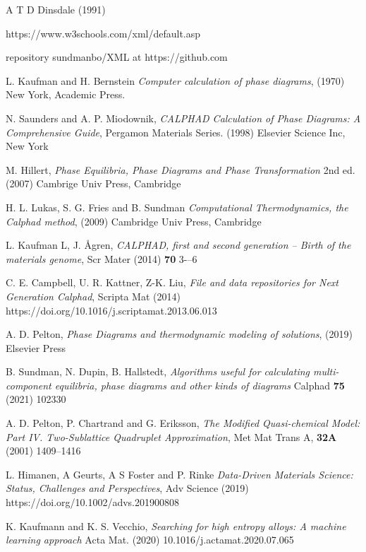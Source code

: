 \documentclass[12pt]{article}
\begin{document}
\begin{thebibliography}{91zzz}

 A T D Dinsdale (1991)

 https://www.w3schools.com/xml/default.asp

 repository sundmanbo/XML at https://github.com

 L. Kaufman and H. Bernstein {\em Computer calculation
  of phase diagrams}, (1970) New York, Academic Press.

 N. Saunders and A. P. Miodownik, {\em CALPHAD
  Calculation of Phase Diagrams: A Comprehensive Guide}, Pergamon
  Materials Series. (1998) Elsevier Science Inc, New York

 M. Hillert, {\em Phase Equilibria, Phase Diagrams and
  Phase Transformation} 2nd ed. (2007) Cambrige Univ Press, Cambridge
  
 H. L. Lukas, S. G. Fries and B. Sundman {\em
  Computational Thermodynamics, the Calphad method}, (2009) Cambridge
  Univ Press, Cambridge

 L. Kaufman L, J. {\AA}gren, {\em CALPHAD, first and
  second generation – Birth of the materials genome}, Scr Mater (2014)
  {\bf 70} 3-–6
  
 C. E. Campbell, U. R. Kattner, Z-K. Liu, {\em File and
  data repositories for Next Generation Calphad}, Scripta Mat (2014)
  https://doi.org/10.1016/j.scriptamat.2013.06.013

 A. D. Pelton, {\em Phase Diagrams and thermodynamic
  modeling of solutions}, (2019) Elsevier Press

 B. Sundman, N. Dupin, B. Hallstedt, {\em Algorithms
  useful for calculating multi-component equilibria, phase diagrams
  and other kinds of diagrams} Calphad {\bf 75} (2021) 102330

 A. D. Pelton, P. Chartrand and G. Eriksson, {\em The
  Modified Quasi-chemical Model: Part IV. Two-Sublattice Quadruplet
  Approximation}, Met Mat Trans A, {\bf 32A} (2001) 1409--1416

 L. Himanen, A Geurts, A S Foster and P. Rinke {\em
  Data-Driven Materials Science: Status, Challenges and Perspectives},
  Adv Science (2019) https://doi.org/10.1002/advs.201900808

 K. Kaufmann and K. S. Vecchio, {\em Searching for high
  entropy alloys: A machine learning approach} Acta Mat. (2020)
  10.1016/j.actamat.2020.07.065


\end{thebibliography}
\end{document}
